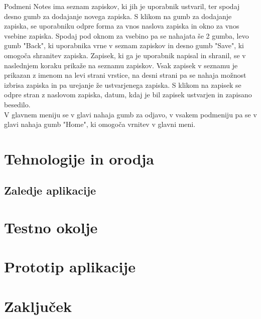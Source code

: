 \documentclass[a4paper, 12pt]{book}
\begin{document}
Podmeni Notes ima seznam zapiskov, ki jih je uporabnik ustvaril, ter spodaj desno gumb za dodajanje novega zapiska. S klikom na gumb za dodajanje zapiska, se uporabniku odpre forma za vnos naslova zapiska in okno za vnos vsebine zapiska. Spodaj pod oknom za vsebino pa se nahajata še 2 gumba, levo gumb "Back", ki uporabnika vrne v seznam zapiskov in desno gumb "Save", ki omogoča shranitev zapiska. Zapisek, ki ga je uporabnik napisal in shranil, se v naslednjem koraku prikaže na seznamu zapiskov. Vsak zapisek v seznamu je prikazan z imenom na levi strani vrstice, na desni strani pa se nahaja možnost izbrisa zapiska in pa urejanje že ustvarjenega zapiska. 
S klikom na zapisek se odpre stran z naslovom zapiska, datum, kdaj je bil zapisek ustvarjen in zapisano besedilo. \\
 
V glavnem meniju se v glavi nahaja gumb za odjavo, v vsakem podmeniju pa se v glavi nahaja gumb "Home", ki omogoča vrnitev v glavni meni. 


\chapter{Tehnologije in orodja}
\label{ch2}



\section{Zaledje aplikacije}


\chapter{Testno okolje}
\label{ch3}


\chapter{Prototip aplikacije}
\label{ch4}


\chapter{Zaključek}
\label{stroka}


\clearpage
{}


\end{document}
